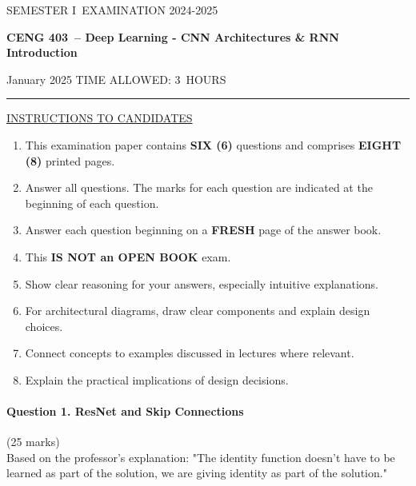 \documentclass[12pt]{article}
\newcommand{\masunitnumber}{CENG 403}
\newcommand{\examdate}{January 2025}
\newcommand{\academicyear}{2024-2025}
\newcommand{\semester}{I}
\newcommand{\coursename}{Deep Learning - CNN Architectures \& RNN Introduction}
\newcommand{\numberofhours}{3}
\begin{document}
\setlength{\headsep}{5truemm}
\setlength{\headheight}{14.5truemm}
\setlength{\voffset}{-0.45truein}
\renewcommand{\headrulewidth}{0.0pt}
\begin{center}
SEMESTER \semester\ EXAMINATION \academicyear
\end{center}
\begin{center}
{\bf \masunitnumber\ -- \coursename}
\end{center}
\vspace{20truemm}
\noindent \examdate\hspace{45truemm} TIME ALLOWED: \numberofhours\ HOURS
\vspace{19truemm}
\hrule
\vspace{19truemm}
\noindent\underline{INSTRUCTIONS TO CANDIDATES}
\vspace{8truemm}
\begin{enumerate}
\item This examination paper contains {\bf SIX (6)} questions and comprises 
{\bf EIGHT (8)} printed pages.
\item Answer all questions. 
The marks for each question are indicated at the beginning of each question.
\item Answer each question beginning on a {\bf FRESH} page of the answer book.
\item This {\bf IS NOT an OPEN BOOK} exam.
\item Show clear reasoning for your answers, especially intuitive explanations.
\item For architectural diagrams, draw clear components and explain design choices.
\item Connect concepts to examples discussed in lectures where relevant.
\item Explain the practical implications of design decisions.
\end{enumerate}
\newpage
\lhead{}
\rhead{\masunitnumber}
\chead{}
\lfoot{}
\cfoot{\thepage}
\rfoot{}
\setlength{\footskip}{45pt}

\paragraph{Question 1. ResNet and Skip Connections}{\hfill (25 marks)}\\
Based on the professor's explanation: "The identity function doesn't have to be learned as part of the solution, we are giving identity as part of the solution."
\end{document}
